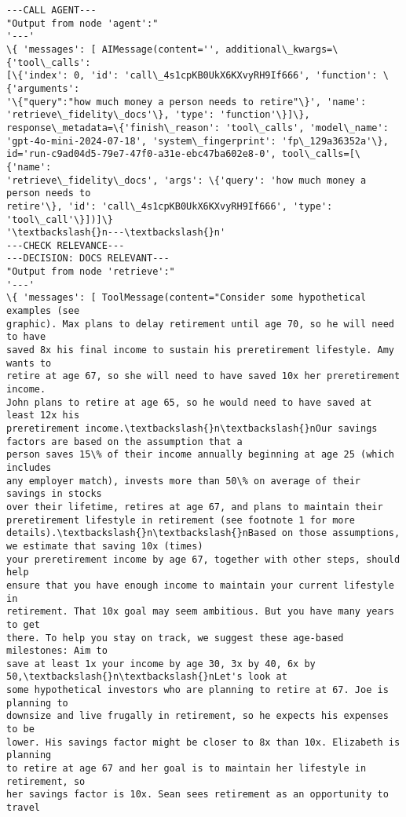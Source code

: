 \documentclass[11pt]{article}
\begin{document}
    \begin{Verbatim}[commandchars=\\\{\}]
---CALL AGENT---
"Output from node 'agent':"
'---'
\{ 'messages': [ AIMessage(content='', additional\_kwargs=\{'tool\_calls':
[\{'index': 0, 'id': 'call\_4s1cpKB0UkX6KXvyRH9If666', 'function': \{'arguments':
'\{"query":"how much money a person needs to retire"\}', 'name':
'retrieve\_fidelity\_docs'\}, 'type': 'function'\}]\},
response\_metadata=\{'finish\_reason': 'tool\_calls', 'model\_name':
'gpt-4o-mini-2024-07-18', 'system\_fingerprint': 'fp\_129a36352a'\},
id='run-c9ad04d5-79e7-47f0-a31e-ebc47ba602e8-0', tool\_calls=[\{'name':
'retrieve\_fidelity\_docs', 'args': \{'query': 'how much money a person needs to
retire'\}, 'id': 'call\_4s1cpKB0UkX6KXvyRH9If666', 'type': 'tool\_call'\}])]\}
'\textbackslash{}n---\textbackslash{}n'
---CHECK RELEVANCE---
---DECISION: DOCS RELEVANT---
"Output from node 'retrieve':"
'---'
\{ 'messages': [ ToolMessage(content="Consider some hypothetical examples (see
graphic). Max plans to delay retirement until age 70, so he will need to have
saved 8x his final income to sustain his preretirement lifestyle. Amy wants to
retire at age 67, so she will need to have saved 10x her preretirement income.
John plans to retire at age 65, so he would need to have saved at least 12x his
preretirement income.\textbackslash{}n\textbackslash{}nOur savings factors are based on the assumption that a
person saves 15\% of their income annually beginning at age 25 (which includes
any employer match), invests more than 50\% on average of their savings in stocks
over their lifetime, retires at age 67, and plans to maintain their
preretirement lifestyle in retirement (see footnote 1 for more
details).\textbackslash{}n\textbackslash{}nBased on those assumptions, we estimate that saving 10x (times)
your preretirement income by age 67, together with other steps, should help
ensure that you have enough income to maintain your current lifestyle in
retirement. That 10x goal may seem ambitious. But you have many years to get
there. To help you stay on track, we suggest these age-based milestones: Aim to
save at least 1x your income by age 30, 3x by 40, 6x by 50,\textbackslash{}n\textbackslash{}nLet's look at
some hypothetical investors who are planning to retire at 67. Joe is planning to
downsize and live frugally in retirement, so he expects his expenses to be
lower. His savings factor might be closer to 8x than 10x. Elizabeth is planning
to retire at age 67 and her goal is to maintain her lifestyle in retirement, so
her savings factor is 10x. Sean sees retirement as an opportunity to travel

\end{Verbatim}
\end{document}
